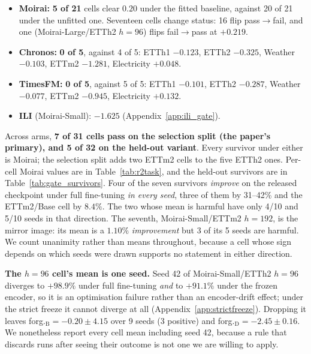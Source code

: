 \begin{itemize}\itemsep1pt
\item \textbf{Moirai:} \textbf{5 of 21} cells clear $0.20$ under the fitted
  baseline, against 20 of 21 under the unfitted one. Seventeen cells change
  status: 16 flip pass${\to}$fail, and one (Moirai-Large/ETTh2 $h{=}96$) flips
  fail${\to}$pass at $+0.219$.
\item \textbf{Chronos:} \textbf{0 of 5}, against 4 of 5: ETTh1 $-0.123$, ETTh2
  $-0.325$, Weather $-0.103$, ETTm2 $-1.281$, Electricity $+0.048$.
\item \textbf{TimesFM:} \textbf{0 of 5}, against 5 of 5: ETTh1 $-0.101$, ETTh2
  $-0.287$, Weather $-0.077$, ETTm2 $-0.945$, Electricity $+0.132$.
\item \textbf{ILI} (Moirai-Small): $\mathbf{-1.625}$ (Appendix~\ref{app:ili_gate}).
\end{itemize}

\noindent Across arms, \textbf{7 of 31 cells pass on the selection split (the
paper's primary), and 5 of 32 on the held-out variant}. Every survivor under
either is Moirai; the selection split adds two ETTm2 cells to the five ETTh2
ones.  Per-cell Moirai values are in Table~\ref{tab:r2task}, and the held-out
survivors are in Table~\ref{tab:gate_survivors}.  Four of the seven survivors
\emph{improve} on the released checkpoint under full fine-tuning \emph{in every
seed}, three of them by 31--42\% and the ETTm2/Base cell by $8.4\%$.  The two
whose mean is harmful have only 4/10 and 5/10 seeds in that direction.  The
seventh, Moirai-Small/ETTm2 $h{=}192$, is the mirror image: its mean is a
$1.10\%$ \emph{improvement} but 3 of its 5 seeds are harmful.  We count
unanimity rather than means throughout, because a cell whose sign depends on
which seeds were drawn supports no statement in either direction.

\textbf{The $h{=}96$ cell's mean is one seed.}  Seed 42 of
Moirai-Small/ETTh2 $h{=}96$ diverges to $+98.9\%$ under full fine-tuning
\emph{and} to $+91.1\%$ under the frozen encoder, so it is an optimisation
failure rather than an encoder-drift effect; under the strict freeze it cannot
diverge at all (Appendix~\ref{app:strictfreeze}).  Dropping it leaves
forg.$_\text{B}{=}{-}0.20{\pm}4.15$ over 9 seeds (3 positive) and
forg.$_\text{D}{=}{-}2.45{\pm}0.16$.  We nonetheless report every cell mean
including seed 42, because a rule that discards runs after seeing their outcome
is not one we are willing to apply.

